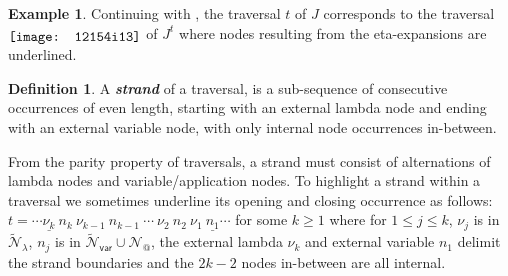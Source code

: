 \documentclass[xchauthor,chkrefs,GCNS,amsmath,amsthm,rotating,leaveRGB]{tcsg}
\makeatletter
\renewcommand{\index}[1]{}
\theoremstyle{plain}
\theoremstyle{definition}
\newtheorem{definition}{Definition}[section]
\newtheorem{example}{Example}[section]
\newcommand{\Nodes}{\mathcal{N}}
\newcommand{\NodesApp}{\Nodes_@}
\newcommand{\ExtendedNodesVar}{\tilde{\Nodes}_{\mathsf{var}}}
\newcommand{\ExtendedNodesLmd}{\tilde{\Nodes}_{\lambda}}
\newcommand{\ctree}{\Tau}
\makeatother
\begin{document}
%
%
%
%
\begin{example}
Continuing with ,
the traversal $t$ of $J$ corresponds to the
traversal\\
$\raisebox{-2pt}{\texttt{[image: 12154i13]}}$ of $J^{t}$ where nodes resulting from the
eta-expansions are underlined.
\end{example}

\begin{definition}\label{ref:strand}
A \textbf{\emph{strand}}\index{strand} of a traversal, is a sub-sequence of
consecutive occurrences of even length, starting with an external lambda node
and ending with an external variable node, with only internal node
occurrences in-between.

From the parity property of traversals, a strand must consist of alternations
of lambda nodes and variable/application nodes. To highlight a strand within
a traversal we sometimes underline its opening and closing occurrence as
follows: $ t = \cdots \underline{\nu _{k}}\ n_{k}\ \nu _{k-1}\ n_{k-1}\
\cdots \ \nu _{2}\ n_{2}\ \nu _{1}\ \underline{n_{1}} \cdots $ for some
$k\geq 1$ where for $1 \leq j \leq k$, $\nu _{j}$ is in $\ExtendedNodesLmd $,
$n_{j}$ is in $\ExtendedNodesVar \cup  \NodesApp $, the external lambda $\nu
_{k}$ and external variable $n_{1}$ delimit the strand boundaries and the
$2k-2$ nodes in-between are all internal.
\end{definition}
\end{document}
